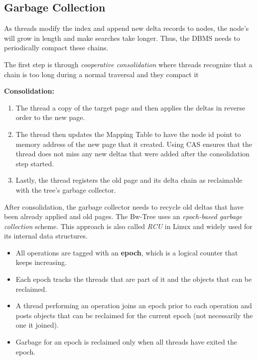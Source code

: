 \documentclass[11pt]{article}
\begin{document}
\subsection*{Garbage Collection}
As threads modify the index and append new delta records to nodes, the node's will grow in length 
and make searches take longer. Thus, the DBMS needs to periodically compact these chains.

The first step is through \textit{cooperative consolidation} where threads recognize that a chain is 
too long during a normal traversal and they compact it

\textbf{Consolidation:}
\begin{enumerate}
    \item
    The thread a copy of the target page and then applies the deltas in reverse order to the new 
    page.
    
    \item
    The thread then updates the Mapping Table to have the node id point to memory address of the 
    new page that it created. Using CAS ensures that the thread does not miss any new deltas 
    that were added after the consolidation step started.
    
    \item
    Lastly, the thread registers the old page and its delta chain as reclaimable with the tree's 
    garbage collector.
\end{enumerate}

After consolidation, the garbage collector needs to recycle old deltas that have been 
already applied and old pages. The Bw-Tree uses an \textit{epoch-based garbage collection} scheme. 
This approach is also called \textit{RCU} in Linux and widely used for its internal data structures.

\begin{itemize}
    \item
    All operations are tagged with an \textbf{epoch}, which is a logical counter that keeps 
    increasing.
    
    \item
    Each epoch tracks the threads that are part of it and the objects that can be reclaimed.
    
    \item
    A thread performing an operation joins an epoch prior to each operation and posts objects that 
    can be reclaimed for the current epoch (not necessarily the one it joined).
    
    \item
    Garbage for an epoch is reclaimed only when all threads have exited the epoch.
\end{itemize}
\end{document}
